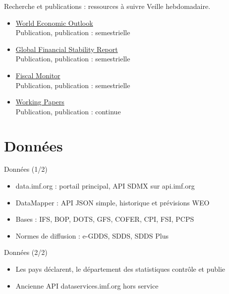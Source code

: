 \documentclass[aspectratio=169,11pt]{beamer}
\begin{document}
\begin{frame}{Recherche et publications : ressources à suivre}
\small
Veille hebdomadaire.
\begin{itemize}
\item \href{https://www.imf.org/en/Publications/WEO}{World Economic Outlook}\\{\footnotesize Publication, publication : semestrielle}
\item \href{https://www.imf.org/en/Publications/GFSR}{Global Financial Stability Report}\\{\footnotesize Publication, publication : semestrielle}
\item \href{https://www.imf.org/en/Publications/FM}{Fiscal Monitor}\\{\footnotesize Publication, publication : semestrielle}
\item \href{https://www.imf.org/en/Publications/WP}{Working Papers}\\{\footnotesize Publication, publication : continue}
\end{itemize}
\end{frame}

\section{Données}
\begin{frame}{Données (1/2)}
\begin{itemize}
\item data.imf.org : portail principal, API SDMX sur api.imf.org
\item DataMapper : API JSON simple, historique et prévisions WEO
\item Bases : IFS, BOP, DOTS, GFS, COFER, CPI, FSI, PCPS
\item Normes de diffusion : e-GDDS, SDDS, SDDS Plus
\end{itemize}
\end{frame}

\begin{frame}{Données (2/2)}
\begin{itemize}
\item Les pays déclarent, le département des statistiques contrôle et publie
\item Ancienne API dataservices.imf.org hors service
\end{itemize}
\end{frame}
\end{document}
